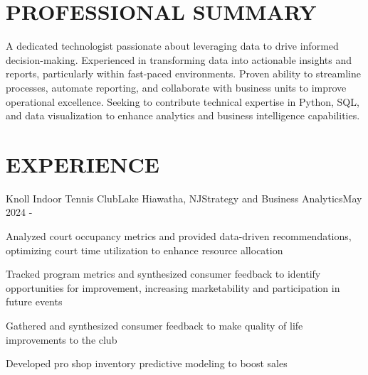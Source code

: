 \documentclass[pdftitle={Michael Tran Resume},pdfauthor={Michael Tran}]{resume}
\begin{document}

\separator

\section{PROFESSIONAL SUMMARY}
A dedicated technologist passionate about leveraging data to drive informed decision-making. Experienced in transforming data into actionable insights and reports, particularly within fast-paced environments. Proven ability to streamline processes, automate reporting, and collaborate with business units to improve operational excellence. Seeking to contribute technical expertise in Python, SQL, and data visualization to enhance analytics and business intelligence capabilities.

\separator

\section{EXPERIENCE}

\begin{experience}{Knoll Indoor Tennis Club}{Lake Hiawatha, NJ}{Strategy and Business Analytics}{May 2024 -}
    \item Analyzed court occupancy metrics and provided data-driven recommendations, optimizing court time utilization to enhance resource allocation
    \item Tracked program metrics and synthesized consumer feedback to identify opportunities for improvement, increasing marketability and participation in future events
    \item Gathered and synthesized consumer feedback to make quality of life improvements to the club
    \item Developed pro shop inventory predictive modeling to boost sales
\end{experience}
\end{document}
